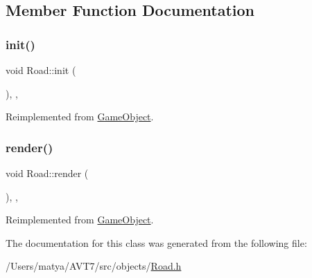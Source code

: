 \subsection{Member Function Documentation}
\mbox{\label{class_road_a2d72b47fce205751e504929e91a7e567}} 
\subsubsection{\texorpdfstring{init()}{init()}}
{\footnotesize\ttfamily void Road\+::init (\begin{DoxyParamCaption}{ }\end{DoxyParamCaption})\hspace{0.3cm}{\ttfamily [inline]}, {\ttfamily [override]}, {\ttfamily [virtual]}}



Reimplemented from \hyperlink{class_game_object_aecb2c1b9f69715d854f7604d5d7978ec}{Game\+Object}.

\mbox{\label{class_road_a2ca4cc3c6043f6d1044992073e9fe3ba}} 
\subsubsection{\texorpdfstring{render()}{render()}}
{\footnotesize\ttfamily void Road\+::render (\begin{DoxyParamCaption}{ }\end{DoxyParamCaption})\hspace{0.3cm}{\ttfamily [inline]}, {\ttfamily [override]}, {\ttfamily [virtual]}}



Reimplemented from \hyperlink{class_game_object_a484efb66a7a27c101e84c11d9905d7a6}{Game\+Object}.



The documentation for this class was generated from the following file\+:\begin{DoxyCompactItemize}
\item 
/\+Users/matya/\+A\+V\+T7/src/objects/\hyperlink{_road_8h}{Road.\+h}\end{DoxyCompactItemize}
